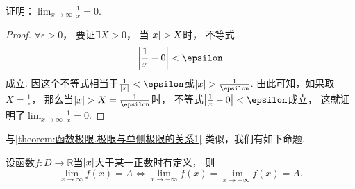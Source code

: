 \begin{example}
证明：\(\lim_{x\to\infty} \frac1x = 0\).
\begin{proof}
\(\forall\epsilon>0\)，
要证\(\exists X > 0\)，
当\(\abs{x}>X\)时，
不等式\[
	\abs{\frac1x-0}<\epsilon
\]成立.
因这个不等式相当于\(\frac{1}{\abs{x}}<\epsilon\)或\(\abs{x}>\frac{1}{\epsilon}\).
由此可知，如果取\(X=\frac{1}{\epsilon}\)，
那么当\(\abs{x}>X=\frac{1}{\epsilon}\)时，
不等式\(\abs{\frac1x-0}<\epsilon\)成立，
这就证明了\(\lim_{x\to\infty} \frac1x = 0\).
\end{proof}
\end{example}

与\cref{theorem:函数极限.极限与单侧极限的关系1} 类似，我们有如下命题.
\begin{proposition}\label{theorem:函数极限.极限与单侧极限的关系2}
设函数\(f\colon D\to\mathbb{R}\)当\(\abs{x}\)大于某一正数时有定义，
则\[
	\lim_{x \to \infty} f(x) = A
	\iff
	\lim_{x \to -\infty} f(x) = \lim_{x \to +\infty} f(x) = A.
\]
\end{proposition}
